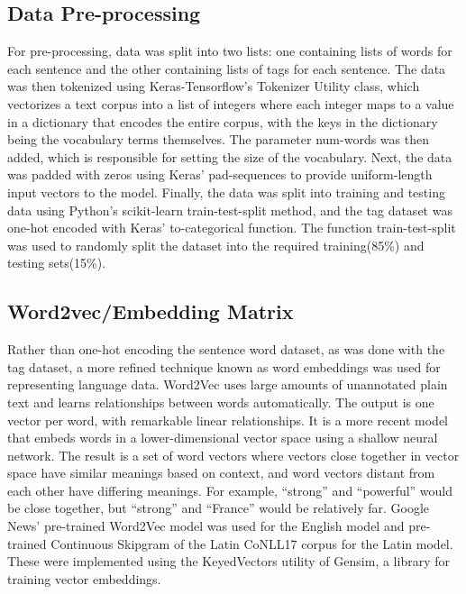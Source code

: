 \documentclass[conference]{IEEEtran}
\begin{document}
 
\subsection{Data Pre-processing}
    For pre-processing, data was split into two lists: one containing lists of words for each sentence and the other containing lists of tags for each sentence. The data was then tokenized using Keras-Tensorflow’s Tokenizer Utility class, which vectorizes a text corpus into a list of integers where each integer maps to a value in a dictionary that encodes the entire corpus, with the keys in the dictionary being the vocabulary terms themselves. The parameter num-words was then added, which is responsible for setting the size of the vocabulary\cite{b2}. Next, the data was padded with zeros using Keras’ pad-sequences to provide uniform-length input vectors to the model. Finally, the data was split into training and testing data using Python’s scikit-learn train-test-split method, and the tag dataset was one-hot encoded with Keras’ to-categorical function. The function train-test-split was used to randomly split the dataset into the required training(85\%) and testing sets(15\%)\cite{b2}.

\subsection{Word2vec/Embedding Matrix}             
    Rather than one-hot encoding the sentence word dataset, as was done with the tag dataset, a more refined technique known as word embeddings was used for representing language data. Word2Vec uses large amounts of unannotated plain text and learns relationships between words automatically. The output is one vector per word, with remarkable linear relationships. It is a more recent model that embeds words in a lower-dimensional vector space using a shallow neural network. The result is a set of word vectors where vectors close together in vector space have similar meanings based on context, and word vectors distant from each other have differing meanings. For example, “strong” and “powerful” would be close together, but “strong” and “France” would be relatively far\cite{b12}. Google News’ pre-trained Word2Vec model was used for the English model and pre-trained Continuous Skipgram of the Latin CoNLL17 corpus for the Latin model. These were implemented using the KeyedVectors utility of Gensim, a library for training vector embeddings.
    
\end{document}
